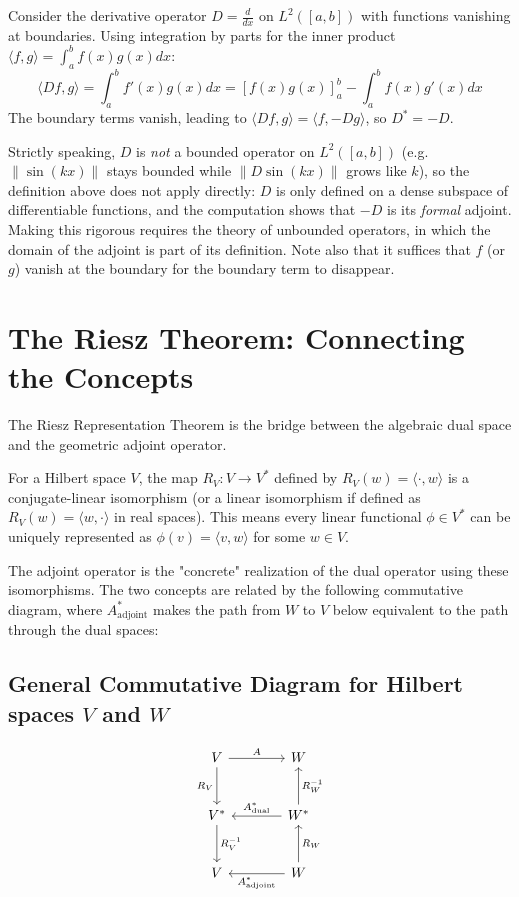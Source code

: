 \begin{notechapter}
\begin{example}
Consider the derivative operator $D = \frac{d}{dx}$ on $L^2([a, b])$ with functions vanishing at boundaries. Using integration by parts for the inner product $\langle f, g \rangle = \int_a^b f(x)g(x)dx$:
\[
\langle Df, g \rangle = \int_a^b f'(x)g(x)dx = [f(x)g(x)]_a^b - \int_a^b f(x)g'(x)dx
\]
The boundary terms vanish, leading to $\langle Df, g \rangle = \langle f, -Dg \rangle$, so $D^* = -D$.

Strictly speaking, $D$ is \emph{not} a bounded operator on $L^2([a,b])$ (e.g.\ $\|\sin(kx)\|$ stays bounded while $\|D\sin(kx)\|$ grows like $k$), so the definition above does not apply directly: $D$ is only defined on a dense subspace of differentiable functions, and the computation shows that $-D$ is its \emph{formal} adjoint. Making this rigorous requires the theory of unbounded operators, in which the domain of the adjoint is part of its definition. Note also that it suffices that $f$ (or $g$) vanish at the boundary for the boundary term to disappear.
\end{example}

\section{The Riesz Theorem: Connecting the Concepts}

The Riesz Representation Theorem is the bridge between the algebraic dual space and the geometric adjoint operator.

\begin{theorem}
For a Hilbert space $V$, the map $R_V : V \to V^*$ defined by $R_V(w) = \langle \cdot, w \rangle$ is a conjugate-linear isomorphism (or a linear isomorphism if defined as $R_V(w) = \langle w, \cdot \rangle$ in real spaces). This means every linear functional $\phi \in V^*$ can be uniquely represented as $\phi(v) = \langle v, w \rangle$ for some $w \in V$.
\end{theorem}

The adjoint operator is the "concrete" realization of the dual operator using these isomorphisms. The two concepts are related by the following commutative diagram, where $A^*_{\text{adjoint}}$ makes the path from $W$ to $V$ below equivalent to the path through the dual spaces:

\subsection{General Commutative Diagram for Hilbert spaces $V$ and $W$}
\[
\begin{tikzcd}[row sep=large, column sep=large]
V \arrow[d, "R_V"'] \arrow[r, "A"] & W  \\
V^* \arrow[d, "R_V^{-1}"] & W^* \arrow[l, "{A^*_{\text{dual}}}"'] \arrow[u, "R_W^{-1}"'] \\
V & W \arrow[l, "A^*_{\text{adjoint}}"] \arrow[u, "R_W"']
\end{tikzcd}
\]


\end{notechapter}
